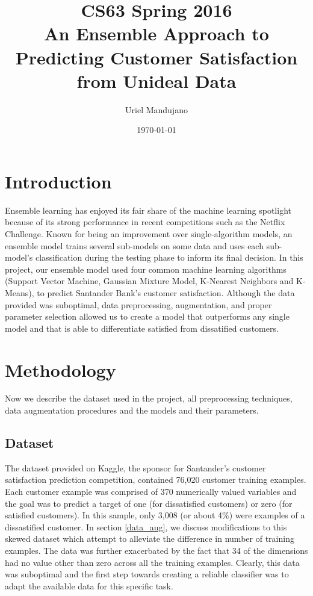 \documentclass[11pt]{article}
\title{CS63 Spring 2016\\An Ensemble Approach to Predicting Customer Satisfaction from Unideal Data}
\author{Uriel Mandujano}
\date{\today}
\begin{document}
\maketitle

\section{Introduction}

Ensemble learning has enjoyed its fair share of the machine learning spotlight 
because of its strong performance in recent competitions such as the Netflix 
Challenge. Known for being an improvement over single-algorithm models, an 
ensemble model trains several sub-models on some data and uses each sub-model's 
classification during the testing phase to inform its final decision. In this 
project, our ensemble model used four common machine learning algorithms 
(Support Vector Machine, Gaussian Mixture Model, K-Nearest Neighbors and 
K-Means), to predict Santander Bank's customer satisfaction. Although the data
provided was suboptimal, data preprocessing, augmentation, and proper 
parameter selection allowed us to create a model that outperforms any single
model and that is able to differentiate satisfied from dissatified customers. 

\section{Methodology}
Now we describe the dataset used in the project, all preprocessing techniques, 
data augmentation procedures and the models and their parameters.

\subsection{Dataset}
The dataset provided on Kaggle, the sponsor for Santander's customer 
satisfaction prediction competition, contained 76,020 customer training 
examples. Each customer example was comprised of 370 numerically valued 
variables and the goal was to predict a target of one (for dissatisfied 
customers) or zero (for satisfied customers). In this sample, only 3,008 (or 
about 4\%) were examples of a dissastified customer. In section \ref{data_aug}, 
we discuss modifications to this skewed dataset which attempt to alleviate the 
difference in number of training examples. The data was further exacerbated by 
the fact that 34 of the dimensions had no value other than zero across all the 
training examples. Clearly, this data was suboptimal and the first step 
towards creating a reliable classifier was to adapt the available data for 
this specific task.
\end{document}
